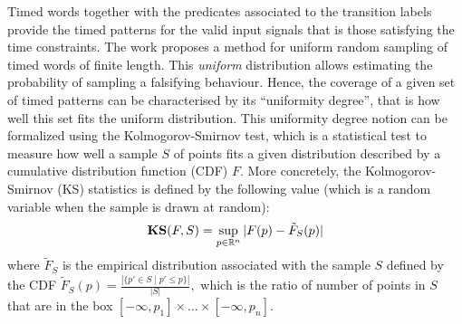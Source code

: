 Timed words together with the predicates associated to the transition labels provide the timed patterns for the valid input signals that is those satisfying the time constraints. The work \cite{BBBK16} proposes a method for uniform random sampling of timed words of finite length. This \emph{uniform} distribution allows estimating the probability of sampling a falsifying behaviour. Hence, the coverage of a given set of timed patterns can be characterised by its ``uniformity degree'', that is how well this set fits the uniform distribution. This uniformity degree notion can be formalized using the Kolmogorov-Smirnov test, which is a statistical test to measure how well a sample $S$ of points fits a given distribution described by a cumulative distribution function (CDF) $F$. More concretely, the Kolmogorov-Smirnov (KS) statistics is defined by the following value (which is a random variable when the sample is drawn at random):
$$\mathbf{KS}(F,S)=\sup_{p\in\mathbb{R}^n}|F(p)-\tilde F_S(p)|$$
where $\tilde F_S$ is the empirical distribution associated with the sample $S$ defined by the CDF 
$\tilde F_S(p)=\displaystyle{\frac{|\{p'\in S\mid  p'\leq p\}|}{|S|}},$ which is the ratio of number of points in $S$ that are in the box $[-\infty, p_1]\times \ldots\times [-\infty, p_n].$ 

